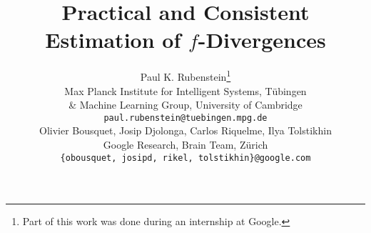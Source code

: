 \documentclass{article}
\title{Practical and Consistent Estimation of $f$-Divergences}
\author{%
  Paul K. Rubenstein\thanks{Part of this work was done during an internship at Google.} \\
  Max Planck Institute for Intelligent Systems, T\"ubingen \\
  \& Machine Learning Group, University of Cambridge \\
  \texttt{paul.rubenstein@tuebingen.mpg.de} \\
  \And
  Olivier Bousquet, Josip Djolonga, Carlos Riquelme, Ilya Tolstikhin \\
  Google Research, Brain Team, Z\"urich \\
  \texttt{\{obousquet, josipd, rikel, tolstikhin\}@google.com}
}
\begin{document}

\maketitle









\small





\appendix
\newpage









\end{document}
